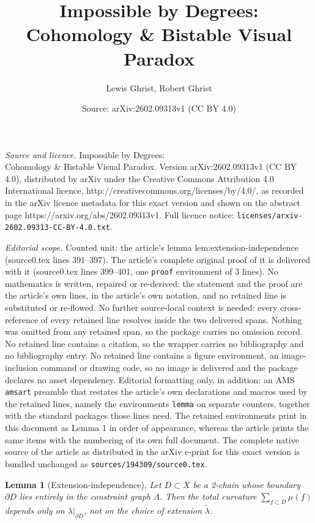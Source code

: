 \documentclass[10pt,a4paper]{amsart}
\title{Impossible by Degrees: \\ Cohomology \& Bistable Visual Paradox}
\author{Lewis Ghrist, Robert Ghrist}
\date{Source: arXiv:2602.09313v1 (CC BY 4.0)}
\newtheorem{lemma}{Lemma}
\newcommand{\cgraph}{\Lambda} %
\newcommand{\coupling}{\lambda} %
\begin{document}
\maketitle

\noindent\emph{Source and licence.} Impossible by Degrees: \\ Cohomology \& Bistable Visual Paradox. Version arXiv:2602.09313v1 (CC BY 4.0), distributed by arXiv under the Creative Commons Attribution 4.0 International licence, http://creativecommons.org/licenses/by/4.0/, as recorded in the arXiv licence metadata for this exact version and shown on the abstract page https://arxiv.org/abs/2602.09313v1. Full licence notice: \texttt{licenses/arxiv-2602.09313-CC-BY-4.0.txt}.\par\smallskip

\noindent\textit{Editorial scope.} Counted unit: the article's lemma lem:extension-independence (source0.tex lines 391--397). The article's complete original proof of it is delivered with it (source0.tex lines 399--401, one \texttt{proof} environment of 3 lines). No mathematics is written, repaired or re-derived: the statement and the proof are the article's own lines, in the article's own notation, and no retained line is substituted or re-flowed.  No further source-local context is needed: every cross-reference of every retained line resolves inside the two delivered spans.  Nothing was omitted from any retained span, so the package carries no omission record.  No retained line contains a citation, so the wrapper carries no bibliography and no bibliography entry.  No retained line contains a figure environment, an image-inclusion command or drawing code, so no image is delivered and the package declares no asset dependency.  Editorial formatting only, in addition: an AMS \texttt{amsart} preamble that restates the article's own declarations and macros used by the retained lines, namely the environments \texttt{lemma} on separate counters, together with the standard packages those lines need.  The retained environments print in this document as Lemma 1 in order of appearance, whereas the article prints the same items with the numbering of its own full document.  The complete native source of the article as distributed in the arXiv e-print for this exact version is bundled unchanged as \texttt{sources/194309/source0.tex}.
\begin{lemma}[Extension-independence]
\label{lem:extension-independence}
Let $D \subset X$ be a 2-chain whose boundary $\partial D$ lies entirely in the 
constraint graph $\cgraph$. Then the total curvature $\sum_{f \subset D} \mu(f)$ 
depends only on $\coupling|_{\partial D}$, not on the choice of extension 
$\tilde{\coupling}$.
\end{lemma}
\end{document}
